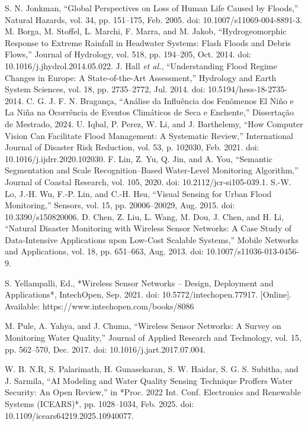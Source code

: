 \documentclass[conference]{IEEEtran}
\begin{document}
\begin{thebibliography}{00}
 S. N. Jonkman, 
``Global Perspectives on Loss of Human Life Caused by Floods,'' 
Natural Hazards, vol. 34, pp. 151--175, Feb. 2005. doi: 10.1007/s11069-004-8891-3.
 M. Borga, M. Stoffel, L. Marchi, F. Marra, and M. Jakob, 
``Hydrogeomorphic Response to Extreme Rainfall in Headwater Systems: Flash Floods and Debris Flows,'' 
Journal of Hydrology, vol. 518, pp. 194--205, Oct. 2014. doi: 10.1016/j.jhydrol.2014.05.022.
 J. Hall \textit{et al.}, 
``Understanding Flood Regime Changes in Europe: A State-of-the-Art Assessment,'' 
Hydrology and Earth System Sciences, vol. 18, pp. 2735--2772, Jul. 2014. doi: 10.5194/hess-18-2735-2014.
 C. G. J. F. N. Bragança, 
``Análise da Influência dos Fenômenos El Niño e La Niña na Ocorrência de Eventos Climáticos de Seca e Enchente,'' 
Dissertação de Mestrado, 2024.
 U. Iqbal, P. Perez, W. Li, and J. Barthelemy, 
``How Computer Vision Can Facilitate Flood Management: A Systematic Review,'' 
International Journal of Disaster Risk Reduction, vol. 53, p. 102030, Feb. 2021. doi: 10.1016/j.ijdrr.2020.102030.
 F. Lin, Z. Yu, Q. Jin, and A. You, 
``Semantic Segmentation and Scale Recognition–Based Water-Level Monitoring Algorithm,'' 
Journal of Coastal Research, vol. 105, 2020. doi: 10.2112/jcr-si105-039.1.
 S.-W. Lo, J.-H. Wu, F.-P. Lin, and C.-H. Hsu, 
``Visual Sensing for Urban Flood Monitoring,'' 
Sensors, vol. 15, pp. 20006--20029, Aug. 2015. doi: 10.3390/s150820006.
 D. Chen, Z. Liu, L. Wang, M. Dou, J. Chen, and H. Li, 
``Natural Disaster Monitoring with Wireless Sensor Networks: A Case Study of Data-Intensive Applications upon Low-Cost Scalable Systems,'' 
Mobile Networks and Applications, vol. 18, pp. 651--663, Aug. 2013. doi: 10.1007/s11036-013-0456-9.

 S. Yellampalli, Ed., 
*Wireless Sensor Networks – Design, Deployment and Applications*, IntechOpen, Sep. 2021. doi: 10.5772/intechopen.77917. [Online]. Available: https://www.intechopen.com/books/8086

 M. Pule, A. Yahya, and J. Chuma, 
``Wireless Sensor Networks: A Survey on Monitoring Water Quality,'' 
Journal of Applied Research and Technology, vol. 15, pp. 562--570, Dec. 2017. doi: 10.1016/j.jart.2017.07.004.

 W. B. N.R, S. Palarimath, H. Gunasekaran, S. W. Haidar, S. G. S. Subitha, and J. Sarmila, 
``AI Modeling and Water Quality Sensing Technique Proffers Water Security: An Open Review,'' 
in *Proc. 2022 Int. Conf. Electronics and Renewable Systems (ICEARS)*, pp. 1028--1034, Feb. 2025. doi: 10.1109/icears64219.2025.10940077.


\end{thebibliography}
\end{document}
